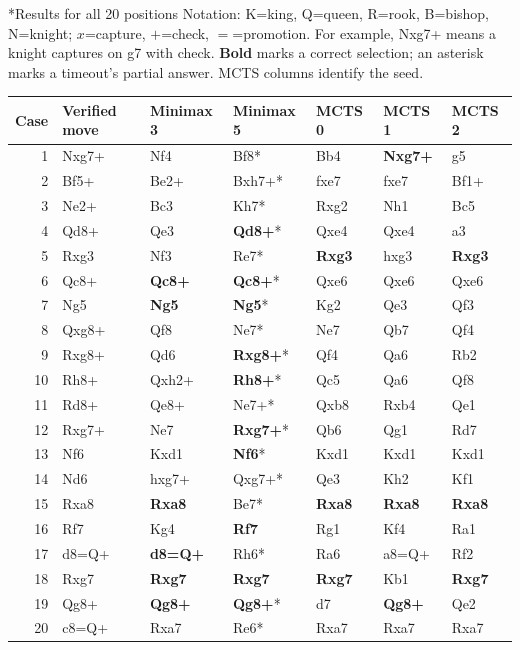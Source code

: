 \documentclass[10pt,letterpaper]{article}
\makeatletter
\renewcommand\section{\@startsection{section}{1}{0pt}{10pt}{5pt}{\normalfont\large\bfseries}}
\makeatother
\begin{document}
\newpage
\section*{Results for all 20 positions}
Notation: K=king, Q=queen, R=rook, B=bishop, N=knight; $x$=capture, $+$=check, $=$=promotion. For example, Nxg7+ means a knight captures on g7 with check. \textbf{Bold} marks a correct selection; an asterisk marks a timeout's partial answer. MCTS columns identify the seed.
\begin{center}\small\renewcommand{\arraystretch}{1.08}
\begin{tabular}{rllllll}\toprule
Case & Verified move & Minimax 3 & Minimax 5 & MCTS 0 & MCTS 1 & MCTS 2\\\midrule
1 & Nxg7+ & Nf4 & Bf8* & Bb4 & \textbf{Nxg7+} & g5 \\
2 & Bf5+ & Be2+ & Bxh7+* & fxe7 & fxe7 & Bf1+ \\
3 & Ne2+ & Bc3 & Kh7* & Rxg2 & Nh1 & Bc5 \\
4 & Qd8+ & Qe3 & \textbf{Qd8+}* & Qxe4 & Qxe4 & a3 \\
5 & Rxg3 & Nf3 & Re7* & \textbf{Rxg3} & hxg3 & \textbf{Rxg3} \\
6 & Qc8+ & \textbf{Qc8+} & \textbf{Qc8+}* & Qxe6 & Qxe6 & Qxe6 \\
7 & Ng5 & \textbf{Ng5} & \textbf{Ng5}* & Kg2 & Qe3 & Qf3 \\
8 & Qxg8+ & Qf8 & Ne7* & Ne7 & Qb7 & Qf4 \\
9 & Rxg8+ & Qd6 & \textbf{Rxg8+}* & Qf4 & Qa6 & Rb2 \\
10 & Rh8+ & Qxh2+ & \textbf{Rh8+}* & Qc5 & Qa6 & Qf8 \\
11 & Rd8+ & Qe8+ & Ne7+* & Qxb8 & Rxb4 & Qe1 \\
12 & Rxg7+ & Ne7 & \textbf{Rxg7+}* & Qb6 & Qg1 & Rd7 \\
13 & Nf6 & Kxd1 & \textbf{Nf6}* & Kxd1 & Kxd1 & Kxd1 \\
14 & Nd6 & hxg7+ & Qxg7+* & Qe3 & Kh2 & Kf1 \\
15 & Rxa8 & \textbf{Rxa8} & Be7* & \textbf{Rxa8} & \textbf{Rxa8} & \textbf{Rxa8} \\
16 & Rf7 & Kg4 & \textbf{Rf7} & Rg1 & Kf4 & Ra1 \\
17 & d8=Q+ & \textbf{d8=Q+} & Rh6* & Ra6 & a8=Q+ & Rf2 \\
18 & Rxg7 & \textbf{Rxg7} & \textbf{Rxg7} & \textbf{Rxg7} & Kb1 & \textbf{Rxg7} \\
19 & Qg8+ & \textbf{Qg8+} & \textbf{Qg8+}* & d7 & \textbf{Qg8+} & Qe2 \\
20 & c8=Q+ & Rxa7 & Re6* & Rxa7 & Rxa7 & Rxa7 \\
\bottomrule\end{tabular}
\end{center}
\end{document}
